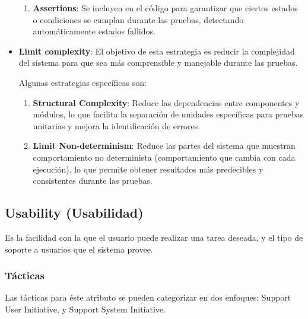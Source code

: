 \documentclass{article}
\begin{document}
\begin{itemize}
\begin{enumerate}
								
				\item \textbf{Assertions}: Se incluyen en el código para garantizar que ciertos estados o condiciones se cumplan durante las pruebas, detectando automáticamente estados fallidos.
				
				
			\end{enumerate}
			
			\item \textbf{Limit complexity}:
			El objetivo de esta estrategia es reducir la complejidad del sistema para que sea más comprensible y manejable durante las pruebas. 
			
			Algunas estrategias específicas son:
			\begin{enumerate}
				\item \textbf{Structural Complexity}: Reduce las dependencias entre componentes y módulos, lo que facilita la separación de unidades específicas para pruebas unitarias y mejora la identificación de errores.
				
				\item \textbf{Limit Non-determinism}: Reduce las partes del sistema que muestran comportamiento no determinista (comportamiento que cambia con cada ejecución), lo que permite obtener resultados más predecibles y consistentes durante las pruebas.
				
			\end{enumerate}	
			
		\end{itemize}
		
		\subsection{Usability  \small{(Usabilidad)}}
		Es la facilidad con la que el usuario puede realizar una tarea deseada, y el tipo de soporte a usuarios que el sistema provee.
		
		\subsubsection{Tácticas}
		Las tácticas para éste atributo se pueden categorizar en dos enfoques: Support User Initiative, y Support System Initiative. 
		
\end{document}
